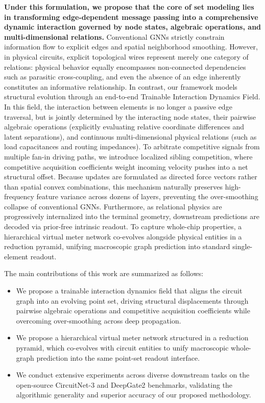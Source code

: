 \textbf{Under this formulation, we propose that the core of set modeling lies in transforming edge-dependent message passing into a comprehensive dynamic interaction governed by node states, algebraic operations, and multi-dimensional relations.} Conventional GNNs strictly constrain information flow to explicit edges and spatial neighborhood smoothing. However, in physical circuits, explicit topological wires represent merely one category of relations: physical behavior equally encompasses non-connected dependencies such as parasitic cross-coupling, and even the absence of an edge inherently constitutes an informative relationship. In contrast, our framework models structural evolution through an end-to-end Trainable Interaction Dynamics Field. In this field, the interaction between elements is no longer a passive edge traversal, but is jointly determined by the interacting node states, their pairwise algebraic operations (explicitly evaluating relative coordinate differences and latent separations), and continuous multi-dimensional physical relations (such as load capacitances and routing impedances). To arbitrate competitive signals from multiple fan-in driving paths, we introduce localized sibling competition, where competitive acquisition coefficients weight incoming velocity pushes into a net structural offset. Because updates are formulated as directed force vectors rather than spatial convex combinations, this mechanism naturally preserves high-frequency feature variance across dozens of layers, preventing the over-smoothing collapse of conventional GNNs. Furthermore, as relational physics are progressively internalized into the terminal geometry, downstream predictions are decoded via prior-free intrinsic readout. To capture whole-chip properties, a hierarchical virtual meter network co-evolves alongside physical entities in a reduction pyramid, unifying macroscopic graph prediction into standard single-element readout.

The main contributions of this work are summarized as follows:
\begin{itemize}
    \item We propose a trainable interaction dynamics field that aligns the circuit graph into an evolving point set, driving structural displacements through pairwise algebraic operations and competitive acquisition coefficients while overcoming over-smoothing across deep propagation.
    \item We propose a hierarchical virtual meter network structured in a reduction pyramid, which co-evolves with circuit entities to unify macroscopic whole-graph prediction into the same point-set readout interface.
    \item We conduct extensive experiments across diverse downstream tasks on the open-source CircuitNet-3 and DeepGate2 benchmarks, validating the algorithmic generality and superior accuracy of our proposed methodology.
\end{itemize}

